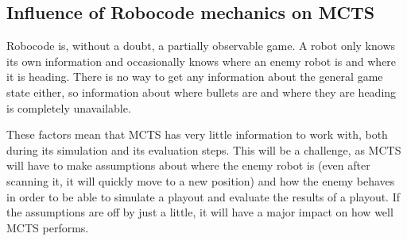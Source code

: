 \subsection{Influence of Robocode mechanics on MCTS}
\label{03_01}

Robocode is, without a doubt, a partially observable game. A robot only knows its own information and occasionally knows where an enemy robot is and where it is heading. There is no way to get any information about the general game state either, so information about where bullets are and where they are heading is completely unavailable.

These factors mean that MCTS has very little information to work with, both during its simulation and its evaluation steps. This will be a challenge, as MCTS will have to make assumptions about where the enemy robot is (even after scanning it, it will quickly move to a new position) and how the enemy behaves in order to be able to simulate a playout and evaluate the results of a playout. If the assumptions are off by just a little, it will have a major impact on how well MCTS performs.